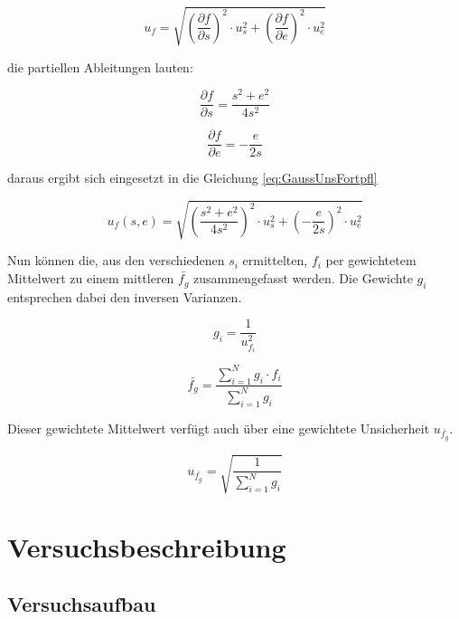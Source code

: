 \documentclass[a4paper,12pt]{article}
\begin{document}
\begin{equation}
    \label{eq:GaussUnsFortpfl}
    u_f = \sqrt{\left(\frac{\partial f}{\partial s}\right)^2 \cdot u_s^2 + \left(\frac{\partial f}{\partial e}\right)^2 \cdot u_e^2}
\end{equation}

die partiellen Ableitungen lauten:

\begin{equation}
    \frac{\partial f}{\partial s} = \frac{s^2+e^2}{4s^2}
\end{equation}

\begin{equation}
    \frac{\partial f}{\partial e} = -\frac{e}{2s}
\end{equation}

daraus ergibt sich eingesetzt in die Gleichung \ref{eq:GaussUnsFortpfl}

\begin{equation}
    \label{eq:BesselBrennwUnsFortpfl}
    u_f(s,e) = \sqrt{\left(\frac{s^2+e^2}{4s^2}\right)^2 \cdot u_s^2 + \left(-\frac{e}{2s}\right)^2 \cdot u_e^2}
\end{equation}

Nun können die, aus den verschiedenen $s_i$ ermittelten, $f_i$ per gewichtetem Mittelwert zu einem
mittleren $\bar{f_g}$ zusammengefasst werden. Die Gewichte $g_i$ entsprechen dabei den inversen
Varianzen.

\begin{equation}
    \label{eq:Gewicht}
    g_i = \frac{1}{u_{f_i}^2}
\end{equation}

\begin{equation}
    \label{eq:Mittelwert}
    \bar{f_g} = \frac{\sum_{i=1}^{N} g_i \cdot f_i}{\sum_{i=1}^{N} g_i}
\end{equation}

Dieser gewichtete Mittelwert verfügt auch über eine gewichtete Unsicherheit $u_{\bar{f_g}}$.

\begin{equation}
    \label{eq:GewichtUnsicherheit}
    u_{\bar{f_g}} = \sqrt{\frac{1}{\sum_{i=1}^{N} g_i}}
\end{equation}

\section{Versuchsbeschreibung}
\subsection{Versuchsaufbau}
\end{document}
